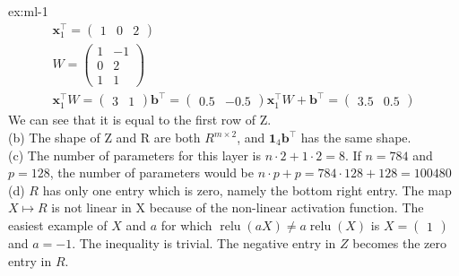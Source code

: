 \begin{solution}{ex:ml-1}
\[\begin{gathered}
      \mathbf{x}^{\!\top}_1=\begin{pmatrix}1&0&2\end{pmatrix}\\
      W = \begin{pmatrix}1&-1\\0&2\\1&1\end{pmatrix}\\
      \mathbf{x}^{\!\top}_1W=\begin{pmatrix}3&1\end{pmatrix}
      \mathbf{b}^{\!\top} = \begin{pmatrix}0.5&-0.5\end{pmatrix}
      \mathbf{x}^{\!\top}_1W+\mathbf{b}^{\!\top}=\begin{pmatrix}3.5&0.5\end{pmatrix}
    \end{gathered}
  \]
  We can see that it is equal to the first row of Z.\\
  (b)
  The shape of Z and R are both $R^{m\times2}$, and $\mathbf{1}_4 \mathbf{b}^{\!\top}$ has the same shape.\\
  (c)
  The number of parameters for this layer is $n\cdot 2+1\cdot 2 = 8$. If $n=784$ and $p=128$, the number of parameters would be $n\cdot p + p = 784\cdot 128 + 128 = 100480$ \\
  (d)
  $R$ has only one entry which is zero, namely the bottom right entry. The map $X \mapsto R$ is not linear in X because of the non-linear activation function. The easiest example of $X$ and $a$ for which $\operatorname{relu}(aX) \ne a\operatorname{relu}(X)$ is $X=\begin{pmatrix}1\end{pmatrix}$ and $a=-1$. The inequality is trivial. The negative entry in $Z$ becomes the zero entry in $R$.
\end{solution}
